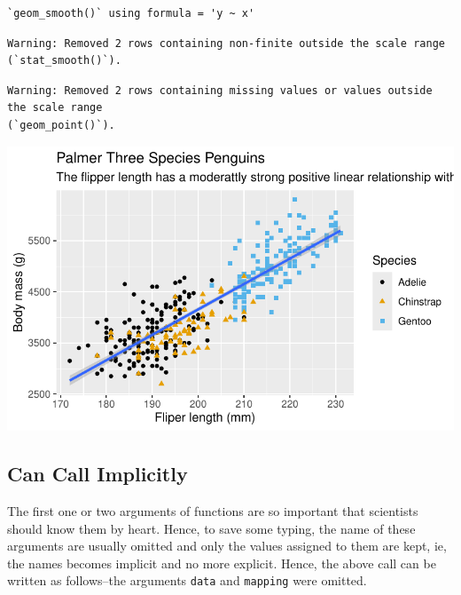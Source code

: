 \documentclass[
  letterpaper,
  DIV=11,
  numbers=noendperiod]{scrreprt}
\begin{document}
\begin{verbatim}
`geom_smooth()` using formula = 'y ~ x'
\end{verbatim}

\begin{verbatim}
Warning: Removed 2 rows containing non-finite outside the scale range
(`stat_smooth()`).
\end{verbatim}

\begin{verbatim}
Warning: Removed 2 rows containing missing values or values outside the scale range
(`geom_point()`).
\end{verbatim}

\includegraphics{src/r-for-data-science/01-data-viz_files/figure-pdf/unnamed-chunk-15-1.pdf}

\subsection{Can Call Implicitly}\label{can-call-implicitly}

The first one or two arguments of functions are so important that
scientists should know them by heart. Hence, to save some typing, the
name of these arguments are usually omitted and only the values assigned
to them are kept, ie, the names becomes implicit and no more explicit.
Hence, the above call can be written as follows--the arguments
\texttt{data} and \texttt{mapping} were omitted.
\end{document}
